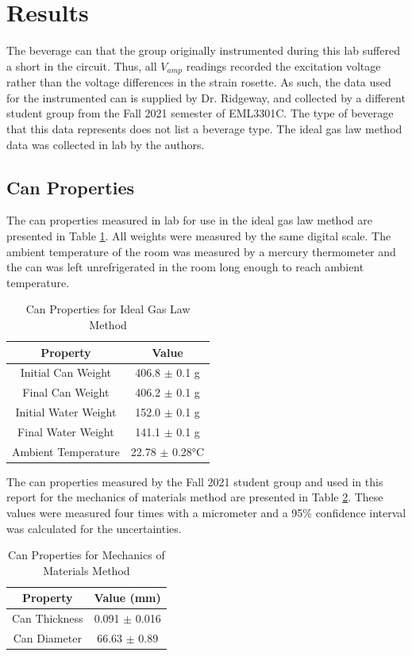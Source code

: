 \documentclass[10pt,journal,letterpaper]{IEEEtran}
\begin{document}
\section{Results}

The beverage can that the group originally instrumented during this lab suffered a short in the circuit.
Thus, all $V_{amp}$ readings recorded the excitation voltage rather than the voltage differences in the strain rosette.
As such, the data used for the instrumented can is supplied by Dr. Ridgeway, and collected by a different student group from the Fall 2021 semester of EML3301C.
The type of beverage that this data represents does not list a beverage type.
The ideal gas law method data was collected in lab by the authors.

\subsection{Can Properties}

The can properties measured in lab for use in the ideal gas law method are presented in Table \ref{tab:IGLProp}.
All weights were measured by the same digital scale.
The ambient temperature of the room was measured by a mercury thermometer and the can was left unrefrigerated in the room long enough to reach ambient temperature.
\begin{table}[H]
\renewcommand\arraystretch{1.25}
\centering
\caption{Can Properties for Ideal Gas Law Method}
\begin{tabular}{cc}
\hline \hline
Property & Value \\
\hline
Initial Can Weight & 406.8 $\pm$ 0.1 g \\
Final Can Weight & 406.2 $\pm$ 0.1 g \\
Initial Water Weight & 152.0 $\pm$ 0.1 g \\
Final Water Weight & 141.1 $\pm$ 0.1 g \\
Ambient Temperature & 22.78 $\pm$ 0.28\unit{\celsius} \\
\hline \hline
\end{tabular}
\label{tab:IGLProp}
\end{table}

The can properties measured by the Fall 2021 student group and used in this report for the mechanics of materials method are presented in Table \ref{tab:MoMProp}.
These values were measured four times with a micrometer and a 95\% confidence interval was calculated for the uncertainties.
\begin{table}[H]
\renewcommand\arraystretch{1.25}
\centering
\caption{Can Properties for Mechanics of Materials Method}
\begin{tabular}{cc}
\hline \hline
Property & Value (mm) \\
\hline
Can Thickness & 0.091 $\pm$ 0.016 \\
Can Diameter & 66.63 $\pm$ 0.89 \\
\hline \hline
\end{tabular}
\label{tab:MoMProp}
\end{table}
\end{document}
